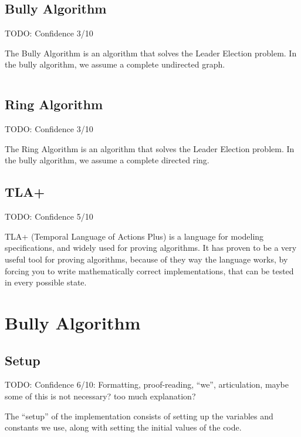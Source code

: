 \documentclass{article}
\begin{document}
\subsection{Bully Algorithm}
TODO: Confidence 3/10

The Bully Algorithm is an algorithm that solves the Leader Election problem. In the bully algorithm, we assume a complete undirected graph.

\begin{lstlisting}

\end{lstlisting}

\subsection{Ring Algorithm}
TODO: Confidence 3/10

The Ring Algorithm is an algorithm that solves the Leader Election problem. In the bully algorithm, we assume a complete directed ring.


\subsection{TLA+}
TODO: Confidence 5/10

TLA+ (Temporal Language of Actions Plus) is a language for modeling specifications, and widely used for proving algorithms. It has proven to be a very useful tool for proving algorithms, because of they way the language works, by forcing you to write mathematically correct implementations, that can be tested in every possible state.

\section{Bully Algorithm}

\subsection{Setup}
TODO: Confidence 6/10: Formatting, proof-reading, ``we'', articulation, maybe some of this is not necessary? too much explanation?

The ``setup'' of the implementation consists of setting up the variables and constants we use, along with setting the initial values of the code.

\noindent{}
\end{document}
